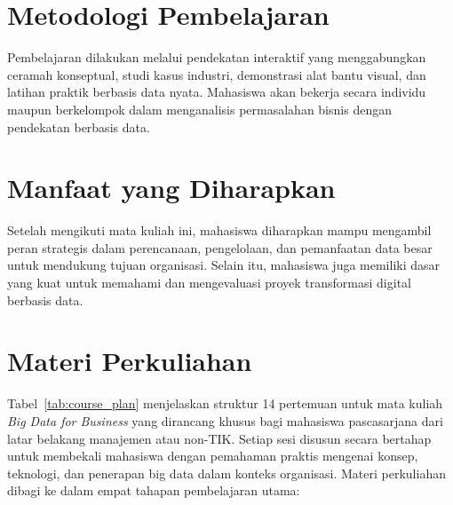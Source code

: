 \section{Metodologi Pembelajaran}

Pembelajaran dilakukan melalui pendekatan interaktif yang menggabungkan ceramah konseptual, studi kasus industri, demonstrasi alat bantu visual, dan latihan praktik berbasis data nyata. Mahasiswa akan bekerja secara individu maupun berkelompok dalam menganalisis permasalahan bisnis dengan pendekatan berbasis data.



\section{Manfaat yang Diharapkan}

Setelah mengikuti mata kuliah ini, mahasiswa diharapkan mampu mengambil peran strategis dalam perencanaan, pengelolaan, dan pemanfaatan data besar untuk mendukung tujuan organisasi. Selain itu, mahasiswa juga memiliki dasar yang kuat untuk memahami dan mengevaluasi proyek transformasi digital berbasis data.


\section{Materi Perkuliahan}

Tabel~\ref{tab:course_plan} menjelaskan struktur 14 pertemuan untuk mata kuliah \textit{Big Data for Business} yang dirancang khusus bagi mahasiswa pascasarjana dari latar belakang manajemen atau non-TIK. Setiap sesi disusun secara bertahap untuk membekali mahasiswa dengan pemahaman praktis mengenai konsep, teknologi, dan penerapan big data dalam konteks organisasi. Materi perkuliahan dibagi ke dalam empat tahapan pembelajaran utama:

